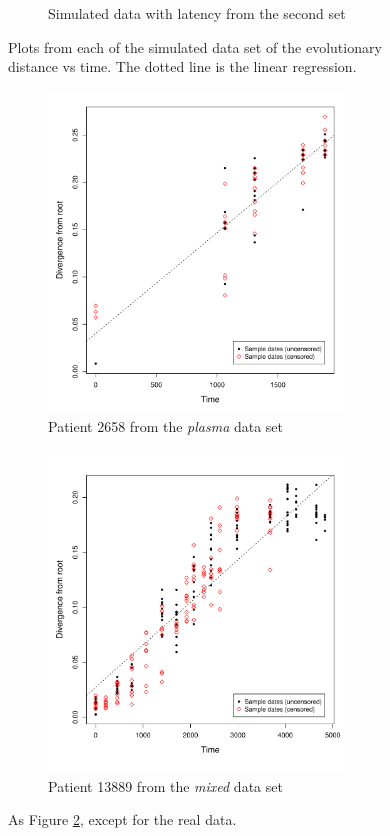 \documentclass[12pt]{article}
\begin{document}
\begin{figure}[ht]
\begin{subfigure}[ht]{8cm}
		\caption{Simulated data with latency from the second set}
		\label{fig:resultslatent2}
	\end{subfigure}		
	\caption[Simulated Data]{Plots from each of the simulated data set of the evolutionary distance vs time. The dotted line is the linear regression.}
	 \label{fig:results1}
\end{figure}

\begin{figure}[ht]
	\centering
	\begin{subfigure}[ht]{8cm}
		\includegraphics[width=8cm]{figures/ancre.pdf}
		\caption{Patient 2658 from the \emph{plasma} data set}
		\label{fig:resultsancre}
	\end{subfigure}
	\begin{subfigure}[ht]{8cm}
		\includegraphics[width=8cm]{figures/lanl.pdf}
		\caption{Patient 13889 from the \emph{mixed} data set}
		\label{fig:resultslanl}
	\end{subfigure}
	\caption[Examples]{As Figure \ref{fig:results1}, except for the real data.}
	\label{fig:results2}
\end{figure}
\end{document}
